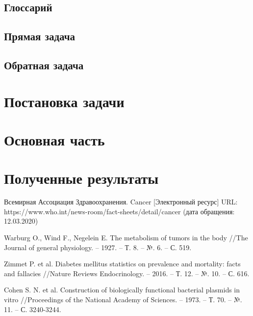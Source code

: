 \documentclass[a4paper, 12pt, left=30mm, right=15mm, top=20mm, bottom=20mm]{report}
\begin{document}
\section{Глоссарий}
\section{Прямая задача}
\section{Обратная задача}
\chapter{Постановка задачи}
\chapter{Основная часть}
\chapter{Полученные результаты}

\begin{thebibliography}{XXXX}
	Всемирная Ассоциация Здравоохранения. Cancer [Электронный ресурс] URL: https://www.who.int/news-room/fact-sheets/detail/cancer (дата обращения: 12.03.2020)
	
	Warburg O., Wind F., Negelein E. The metabolism of tumors in the body //The Journal of general physiology. – 1927. – Т. 8. – №. 6. – С. 519.
	
	Zimmet P. et al. Diabetes mellitus statistics on prevalence and mortality: facts and fallacies //Nature Reviews Endocrinology. – 2016. – Т. 12. – №. 10. – С. 616.
	
	Cohen S. N. et al. Construction of biologically functional bacterial plasmids in vitro //Proceedings of the National Academy of Sciences. – 1973. – Т. 70. – №. 11. – С. 3240-3244.
\end{thebibliography}
\end{document}
